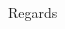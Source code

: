 \documentclass[11pt]{article}
\begin{document}
\begin{spacing}{1.2}

\noindent Regards \\

\end{spacing}

\vspace{3cm}

\end{document}
